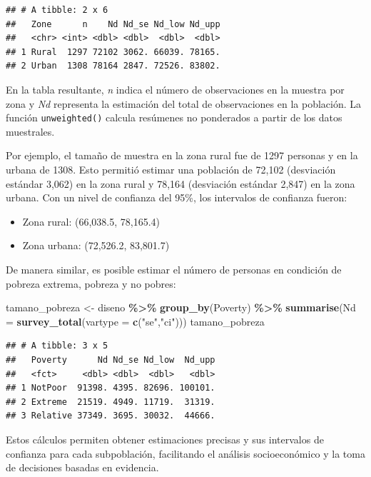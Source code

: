 \documentclass[
  12pt,
]{book}
\newenvironment{Shaded}{\begin{snugshade}}{\end{snugshade}}
\newcommand{\AttributeTok}[1]{\textcolor[rgb]{0.13,0.29,0.53}{#1}}
\newcommand{\FunctionTok}[1]{\textcolor[rgb]{0.13,0.29,0.53}{\textbf{#1}}}
\newcommand{\NormalTok}[1]{#1}
\newcommand{\OtherTok}[1]{\textcolor[rgb]{0.56,0.35,0.01}{#1}}
\newcommand{\SpecialCharTok}[1]{\textcolor[rgb]{0.81,0.36,0.00}{\textbf{#1}}}
\newcommand{\StringTok}[1]{\textcolor[rgb]{0.31,0.60,0.02}{#1}}
\providecommand{\tightlist}{%
  \setlength{\itemsep}{0pt}\setlength{\parskip}{0pt}}
\begin{document}
\begin{verbatim}
## # A tibble: 2 x 6
##   Zone      n    Nd Nd_se Nd_low Nd_upp
##   <chr> <int> <dbl> <dbl>  <dbl>  <dbl>
## 1 Rural  1297 72102 3062. 66039. 78165.
## 2 Urban  1308 78164 2847. 72526. 83802.
\end{verbatim}

En la tabla resultante, \emph{n} indica el número de observaciones en la muestra por zona y \emph{Nd} representa la estimación del total de observaciones en la población. La función \texttt{unweighted()} calcula resúmenes no ponderados a partir de los datos muestrales.

Por ejemplo, el tamaño de muestra en la zona rural fue de 1297 personas y en la urbana de 1308. Esto permitió estimar una población de 72,102 (desviación estándar 3,062) en la zona rural y 78,164 (desviación estándar 2,847) en la zona urbana. Con un nivel de confianza del 95\%, los intervalos de confianza fueron:

\begin{itemize}
\tightlist
\item
  Zona rural: (66,038.5, 78,165.4)
\item
  Zona urbana: (72,526.2, 83,801.7)
\end{itemize}

De manera similar, es posible estimar el número de personas en condición de pobreza extrema, pobreza y no pobres:

\begin{Shaded}
\begin{Highlighting}[]
\NormalTok{tamano\_pobreza }\OtherTok{\textless{}{-}}\NormalTok{ diseno }\SpecialCharTok{\%\textgreater{}\%} \FunctionTok{group\_by}\NormalTok{(Poverty) }\SpecialCharTok{\%\textgreater{}\%} 
                  \FunctionTok{summarise}\NormalTok{(}\AttributeTok{Nd =} \FunctionTok{survey\_total}\NormalTok{(}\AttributeTok{vartype =} \FunctionTok{c}\NormalTok{(}\StringTok{"se"}\NormalTok{,}\StringTok{"ci"}\NormalTok{)))}
\NormalTok{tamano\_pobreza}
\end{Highlighting}
\end{Shaded}

\begin{verbatim}
## # A tibble: 3 x 5
##   Poverty      Nd Nd_se Nd_low  Nd_upp
##   <fct>     <dbl> <dbl>  <dbl>   <dbl>
## 1 NotPoor  91398. 4395. 82696. 100101.
## 2 Extreme  21519. 4949. 11719.  31319.
## 3 Relative 37349. 3695. 30032.  44666.
\end{verbatim}

Estos cálculos permiten obtener estimaciones precisas y sus intervalos de confianza para cada subpoblación, facilitando el análisis socioeconómico y la toma de decisiones basadas en evidencia.
\end{document}
